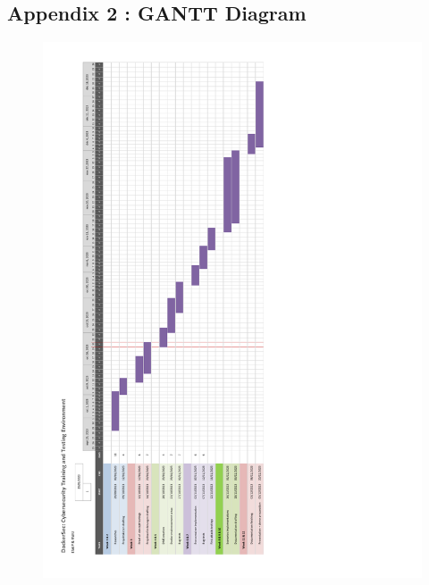 \documentclass[a4paper,11pt,singlespacing]{article}
\begin{document}
\subsection{Appendix 2 : GANTT Diagram}
\label{Appendix2}
\begin{figure}[bp!]
    \centering
    \includegraphics[scale = 0.8]{images/gantt_diagram.pdf}
\end{figure}
\newpage
\end{document}
